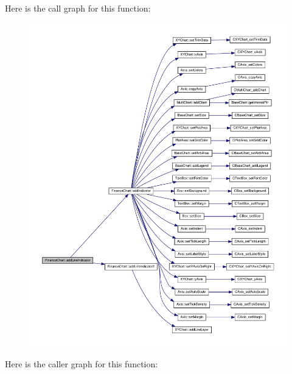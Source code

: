 Here is the call graph for this function\+:
\nopagebreak
\begin{figure}[H]
\begin{center}
\leavevmode
\includegraphics[width=350pt]{class_finance_chart_a799daf3775d8e100cd771eba230252ff_cgraph}
\end{center}
\end{figure}
Here is the caller graph for this function\+:
\nopagebreak
